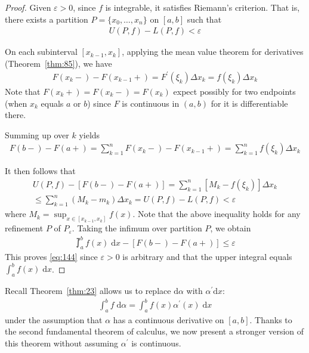 \documentclass[thmcnt=section, 12pt]{my-elegantbook}
\begin{document}
\begin{proof}
	Given $\varepsilon > 0$, since $f$ is integrable,
	it satisfies Riemann's criterion.
	That is,
	there exists a 
	partition $P=\{x_0, \ldots, x_n\}$ on $[a, b]$
	such that
	\begin{align*}
		U(P,f) - L(P,f) < \varepsilon
	\end{align*}

	On each subinterval $[x_{k-1}, x_k]$,
	applying the mean value theorem for derivatives 
	(Theorem~\ref{thm:85}),
	we have 
	\begin{align*}
		F(x_k -) - F(x_{k-1} +)
		= F^\prime(\xi_k) \Delta x_k
		= f(\xi_k) \Delta x_k
	\end{align*}
	Note that $F(x_k +) = F(x_k - ) = F(x_k)$ expect possibly
	for two endpoints (when $x_k$ equals $a$ or $b$)
	since $F$ is continuous in $(a, b)$
	for it is differentiable there.

	Summing up over $k$ yields
	\begin{align*}
		F(b-) - F(a+)
		= \sum_{k=1}^n F(x_{k} - ) - F(x_{k-1} + )
		= \sum_{k=1}^n f(\xi_k) \Delta x_k
	\end{align*}

	It then follows that 
	\begin{multline*}
		U(P,f) - [F(b-) - F(a+)]
		= \sum_{k=1}^n [M_k - f(\xi_k)] \Delta x_k \\
		\leq \sum_{k=1}^n (M_k - m_k) \Delta x_k
		= U(P,f) - L(P,f)
		< \varepsilon
	\end{multline*}
	where $M_k = \sup_{x \in [x_{k-1}, x_k]} f(x)$.
	Note that the above inequality
	holds for any refinement $P$ of $P_\varepsilon$.
	Taking the infimum over partition $P$, we obtain
	\begin{align*}
		\upint_a^b f(x) \; \mathrm{d} x 
		- [F(b-) - F(a+)]
		\leq \varepsilon
	\end{align*}
	This proves \eqref{eq:144} since $\varepsilon > 0$
	is arbitrary
	and that the upper integral 
	equals $\int_a^b f(x) \; \mathrm{d} x$.
\end{proof}


Recall Theorem~\ref{thm:23} allows us to
replace $\mathrm{d} \alpha$ with $\alpha^\prime \mathrm{d} x$:
\begin{align*}
	\int_a^b f \; \mathrm{d} \alpha
	= \int_a^b f(x) \alpha^\prime(x) \; \mathrm{d} x
\end{align*}
under the assumption that $\alpha$ has 
a continuous derivative on $[a, b]$.
Thanks to the second fundamental theorem of calculus,
we now present a stronger version of this theorem
without assuming $\alpha^\prime$ is continuous.
\end{document}
